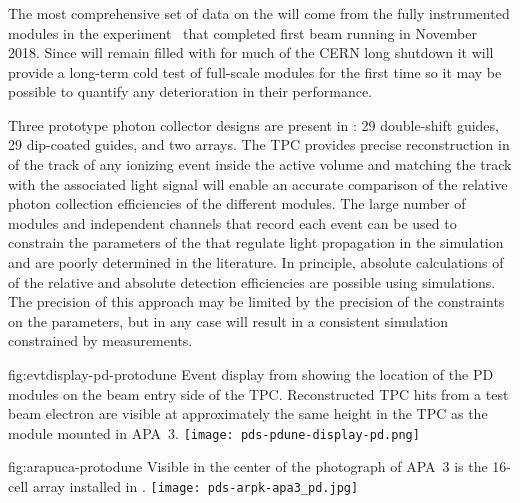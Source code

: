 \subsubsection{}
\label{sec:valid-pdsp}

The most comprehensive set of data on the  will come from the fully instrumented modules in the  experiment~\cite{Abi:2017aow} that completed first beam running in November \num{2018}. 
Since  will remain filled with \lar for much of the CERN long shutdown it will provide a long-term cold test of full-scale  modules for the first time so it may be possible to quantify any deterioration in their performance.

Three prototype photon collector designs are present in : \num{29} double-shift guides, \num{29} dip-coated guides, and two  arrays.
The TPC provides precise reconstruction in \threed of the track of any ionizing event inside the active volume and matching the track with the associated light signal will enable an accurate comparison of the relative photon collection efficiencies of the different  modules. 
The large number of modules and independent channels that record each event can be used to constrain the parameters of the \lar that regulate  light propagation in the simulation and are poorly determined in the literature. %
In principle, absolute calculations of of the relative and absolute detection efficiencies are possible using  simulations.
The precision of this approach may be limited by the precision of the constraints on the parameters, but in any case will result in a consistent simulation constrained by measurements. 


\begin{dunefigure}{fig:evtdisplay-pd-protodune}
{Event display from  showing the location of the PD modules on the beam entry side of the TPC. Reconstructed TPC hits from a test beam electron are visible at approximately the same height in the TPC as the  module mounted in APA~3.} 
\texttt{[image: pds-pdune-display-pd.png]}
\end{dunefigure}

\begin{dunefigure}{fig:arapuca-protodune}
{Visible in the center of the photograph of APA~3 is the 16-cell  array installed in .} 
\texttt{[image: pds-arpk-apa3\_pd.jpg]} 
\end{dunefigure}

